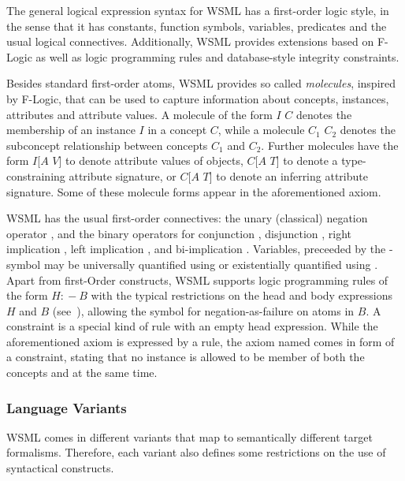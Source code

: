 The general logical expression syntax for WSML has a first-order
logic style, in the sense that it has constants, function symbols,
variables, predicates and the usual logical connectives.
Additionally, WSML provides extensions based on F-Logic
\cite{Kifer+LausenETAL-LogiFounObjeFram:95} as well as logic
programming rules and database-style integrity constraints.

Besides standard first-order atoms, WSML provides so called
\emph{molecules}, inspired by F-Logic, that can be used to capture
information about concepts, instances, attributes and attribute
values. A molecule of the form $I$  $C$ denotes the
membership of an instance $I$ in a concept $C$, while a molecule
$C_1$  $C_2$ denotes the subconcept
relationship between concepts $C_1$ and $C_2$. Further molecules
have the form $I$[$A$  $V$] to denote attribute
values of objects, $C$[$A$  $T$] to denote a type-
constraining attribute signature, or $C$[$A$ 
$T$] to denote an inferring attribute signature. Some of these
molecule forms appear in the aforementioned axiom.

WSML has the usual first-order connectives: the unary (classical)
negation operator , and the binary operators for
conjunction , disjunction , right implication
, left implication , and
bi-implication . Variables, preceeded by the
-symbol may be universally quantified using
 or existentially quantified using .
Apart from first-Order constructs, WSML supports logic programming
rules of the form $H :\!- B$ with the typical restrictions on the
head and body expressions $H$ and $B$ (see~\cite{wsml-spec}),
allowing the symbol  for negation-as-failure on atoms in
$B$. A constraint is a special kind of rule with an empty head
expression. While the aforementioned axiom is expressed by a rule,
the axiom named
 comes in form
of a constraint, stating that no instance is allowed to be member
of both the concepts  and
 at the same time.

\subsubsection{Language Variants}
WSML comes in different variants that map to semantically
different target formalisms. Therefore, each variant also defines
some restrictions on the use of syntactical constructs.


